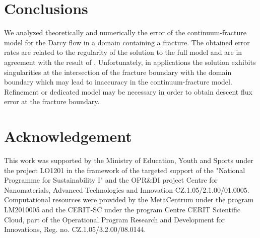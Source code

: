 \documentclass{llncs}
\renewcommand{\note}[2]{{\color{blue} \textbf{ #1:} \textit{#2}}}
\begin{document}
\section{Conclusions}

We analyzed theoretically and numerically the error of the continuum-fracture model for the Darcy flow in a domain containing a fracture.
The obtained error rates are related to the regularity of the solution to the full model and are in agreement with the result of \cite{martin_modeling_2005}.
Unfortunately, in applications the solution exhibits singularities at the intersection of the fracture boundary with the domain boundary 
which may lead to inaccuracy in the continuum-fracture model. Refinement or dedicated model may be necessary in order to obtain descent 
flux error at the fracture boundary.







\section*{Acknowledgement}
This work was supported by the Ministry of Education, Youth and Sports under the project LO1201 in the framework of the targeted support of the "National Programme for Sustainability I" and the OPR\&DI project Centre for Nanomaterials, Advanced Technologies and Innovation CZ.1.05/2.1.00/01.0005.
Computational resources were provided by the MetaCentrum under the program LM2010005
and the CERIT-SC under the program Centre CERIT Scientific Cloud,
part of the Operational Program Research and Development for Innovations, Reg. no. CZ.1.05/3.2.00/08.0144.




\end{document}
